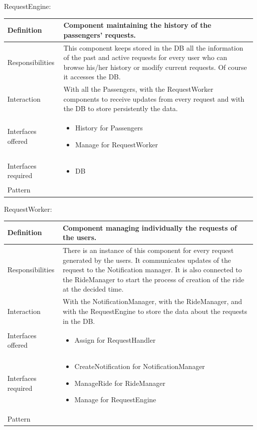 \documentclass[a4paper,11pt]{report} %
\begin{document}
	\pagebreak
	\vspace*{-0.35cm}
	\centerline{RequestEngine:}
	\begin{center}
		\begin{tabular}{| l | p{9cm} |}\hline
			Definition & Component maintaining the history of the passengers' requests.\\\hline
			Responsibilities & This component keeps stored in the DB all the information of the past and active requests for every user who can browse his/her history or modify current requests. Of course it accesses the DB.\\\hline
			Interaction & With all the Passengers, with the RequestWorker components to receive updates from every request and with the DB to store persistently the data.\\\hline
			Interfaces offered & \begin{itemize}
				\item History for Passengers
				\item Manage for RequestWorker
			\end{itemize}\\\hline
			Interfaces required & \begin{itemize}
				\item DB
			\end{itemize}\\\hline
			Pattern & \\\hline
		\end{tabular}
	\end{center}		
	
	\vspace*{0.35cm}
	\centerline{RequestWorker:}
	\begin{center}
		\begin{tabular}{| l | p{9cm} |}\hline
			Definition & Component managing individually the requests of the users.\\\hline
			Responsibilities & There is an instance of this component for every request generated by the users. It communicates updates of the request to the Notification manager. It is also connected to the RideManager to start the process of creation of the ride at the decided time.\\\hline
			Interaction & With the NotificationManager, with the RideManager, and with the RequestEngine to store the data about the requests in the DB.\\\hline
			Interfaces offered & \begin{itemize}
				\item Assign for RequestHandler
			\end{itemize}\\\hline
			Interfaces required & \begin{itemize}
				\item CreateNotification for NotificationManager
				\item ManageRide for RideManager
				\item Manage for RequestEngine
			\end{itemize}\\\hline
			Pattern & \\\hline
		\end{tabular}
	\end{center}	
	
\end{document}
